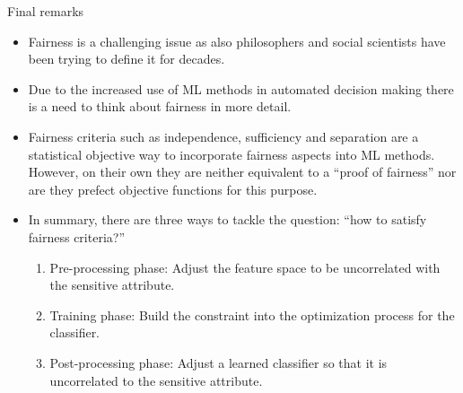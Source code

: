 \documentclass[11pt,compress,t,notes=noshow, xcolor=table]{beamer}
\begin{document}
\begin{vbframe}{Final remarks}
	\small
		\begin{itemize}
			\item Fairness is a challenging issue as also philosophers and social scientists have been trying to define it for decades.
%			
			\item Due to the increased use of ML methods in automated decision making there is a need to think about fairness in more detail.
%			
			\item  Fairness criteria such as independence, sufficiency and separation are a statistical objective way to incorporate fairness aspects into ML methods. However, on their own they are neither equivalent to a ``proof of fairness'' nor are they prefect objective functions for this purpose.
%			
			\item In summary, there are three ways to tackle the question: ``how to satisfy fairness criteria?''
%			
			\begin{enumerate}
				\small
				\item Pre-processing phase: Adjust the feature space to be uncorrelated
				with the sensitive attribute.
				\item Training phase: Build the constraint into the optimization process
				for the classifier.
				\item Post-processing phase: Adjust a learned classifier so that it is uncorrelated to the sensitive attribute.
			\end{enumerate}
			
		\end{itemize}
	
\end{vbframe}

%
\endlecture
\end{document}
